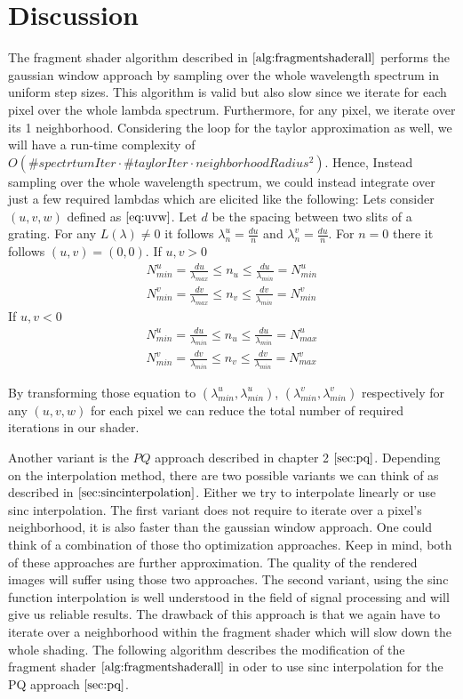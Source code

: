 \section{Discussion}
\label{sec:impldiscus}
The fragment shader algorithm described in $\ref{alg:fragmentshaderall}$ performs the gaussian window approach by sampling over the whole wavelength spectrum in uniform step sizes. This algorithm is valid but also slow since we iterate for each pixel over the whole lambda spectrum. Furthermore, for any pixel, we iterate over its 1 neighborhood. Considering the loop for the taylor approximation as well, we will have a run-time complexity of $O(\#spectrtumIter \cdot \#taylorIter \cdot neighborhoodRadius^2)$. 
Hence, Instead sampling over the whole wavelength spectrum, we could instead integrate over just a few required lambdas which are elicited like the following: Lets consider $(u,v,w)$ defined as $\ref{eq:uvw}$. Let $d$ be the spacing between two slits of a grating. For any $L(\lambda) \neq 0$ it follows $\lambda_{n}^{u} = \frac{d u}{n}$ and $\lambda_{n}^{v} = \frac{d u}{n}$. For $n = 0$ there it follows $(u,v)=(0,0)$. 
If $u,v > 0$
\begin{align*}
    N_{min}^{u} = \frac{d u}{\lambda_{max}} \leq n_{u} \leq \frac{d u}{\lambda_{min}} = N_{min}^{u}\\
    N_{min}^{v} = \frac{d v}{\lambda_{max}} \leq n_{v} \leq \frac{d v}{\lambda_{min}} = N_{min}^{v}
\end{align*}
If $u,v < 0$
\begin{align*}
    N_{min}^{u} = \frac{d u}{\lambda_{min}} \leq n_{u} \leq \frac{d u}{\lambda_{min}} = N_{max}^{u}\\
    N_{min}^{v} = \frac{d v}{\lambda_{min}} \leq n_{v} \leq \frac{d v}{\lambda_{min}} = N_{max}^{v}
\end{align*}

By transforming those equation to $(\lambda_{min}^{u}, \lambda_{min}^{u})$, $(\lambda_{min}^{v}, \lambda_{min}^{v})$ respectively for any $(u,v,w)$ for each pixel we can reduce the total number of required iterations in our shader.  

Another variant is the $PQ$ approach described in chapter 2 $\ref{sec:pq}$. Depending on the interpolation method, there are two possible variants we can think of as described in $\ref{sec:sincinterpolation}$. Either we try to interpolate linearly or use sinc interpolation.
The first variant does not require to iterate over a pixel's neighborhood, it is also faster than the gaussian window approach. One could think of a combination of those tho optimization approaches. Keep in mind, both of these approaches are further approximation. The quality of the rendered images will suffer using those two approaches. The second variant, using the sinc function interpolation is well understood in the field of signal processing and will give us reliable results. The drawback of this approach is that we again have to iterate over a neighborhood within the fragment shader which will slow down the whole shading. The following algorithm describes the modification of the fragment shader  $\ref{alg:fragmentshaderall}$ in oder to use sinc interpolation for the PQ approach $\ref{sec:pq}$.  

